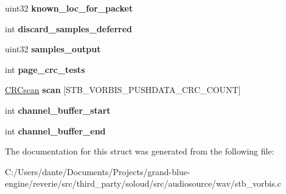 \begin{DoxyCompactItemize}
$$uint32 {\bfseries known\+\_\+loc\+\_\+for\+\_\+packet}
\item 
\mbox{\label{structstb__vorbis_adbacf2120eaa0099f886770c51d633d2}} 
int {\bfseries discard\+\_\+samples\+\_\+deferred}
\item 
\mbox{\label{structstb__vorbis_a6b955aa04bfd9f4a59bca3d8d027b592}} 
uint32 {\bfseries samples\+\_\+output}
\item 
\mbox{\label{structstb__vorbis_a4d3ba492214db27970d9292a3d60b421}} 
int {\bfseries page\+\_\+crc\+\_\+tests}
\item 
\mbox{\label{structstb__vorbis_ac2972ae486c5a1bc59e1f0ebb3fa0739}} 
\mbox{\hyperlink{struct_c_r_cscan}{C\+R\+Cscan}} {\bfseries scan} \mbox{[}S\+T\+B\+\_\+\+V\+O\+R\+B\+I\+S\+\_\+\+P\+U\+S\+H\+D\+A\+T\+A\+\_\+\+C\+R\+C\+\_\+\+C\+O\+U\+NT\mbox{]}
\item 
\mbox{\label{structstb__vorbis_af0bf960e2d513d207ee6a9f38eefe770}} 
int {\bfseries channel\+\_\+buffer\+\_\+start}
\item 
\mbox{\label{structstb__vorbis_ab0c6866c39ae3cd00d5ede2dd5ff512c}} 
int {\bfseries channel\+\_\+buffer\+\_\+end}
\end{DoxyCompactItemize}


The documentation for this struct was generated from the following file\+:\begin{DoxyCompactItemize}
\item 
C\+:/\+Users/dante/\+Documents/\+Projects/grand-\/blue-\/engine/reverie/src/third\+\_\+party/soloud/src/audiosource/wav/stb\+\_\+vorbis.\+c\end{DoxyCompactItemize}
